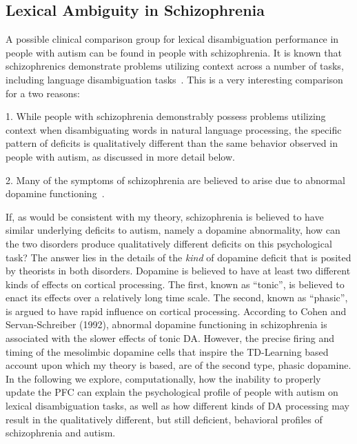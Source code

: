 \subsection{Lexical Ambiguity in Schizophrenia}
A possible clinical comparison group for lexical disambiguation performance in people with autism can be found in people with schizophrenia.  It is known that schizophrenics demonstrate problems utilizing context across a number of tasks, including language disambiguation tasks~\cite{CohenJD:1992:Schizophrenia}.  This is a very interesting comparison for a two reasons:

1.  While people with schizophrenia demonstrably possess problems utilizing context when disambiguating words in natural language processing, the specific pattern of deficits is qualitatively different than the same behavior observed in people with autism, as discussed in more detail below.

2.  Many of the symptoms of schizophrenia are believed to arise due to abnormal dopamine functioning~\cite{CohenJD:1992:Schizophrenia}.  

If, as would be consistent with my theory, schizophrenia is believed to have similar underlying deficits to autism, namely a dopamine abnormality, how can the two disorders produce qualitatively different deficits on this psychological task?  The answer lies in the details of the \emph{kind} of dopamine deficit that is posited by theorists in both disorders.  Dopamine is believed to have at least two different kinds of effects on cortical processing.  The first, known as ``tonic'', is believed to enact its effects over a relatively long time scale.  The second, known as ``phasic'', is argued to have rapid influence on cortical processing.  According to Cohen and Servan-Schreiber (1992), abnormal dopamine functioning in schizophrenia is associated with the slower effects of tonic DA.  However, the precise firing and timing of the mesolimbic dopamine cells that inspire the TD-Learning based account upon which my theory is based, are of the second type, phasic dopamine.  In the following we explore, computationally, how the inability to properly update the PFC can explain the psychological profile of people with autism on lexical disambiguation tasks, as well as how different kinds of DA processing may result in the qualitatively different, but still deficient, behavioral profiles of schizophrenia and autism. 

